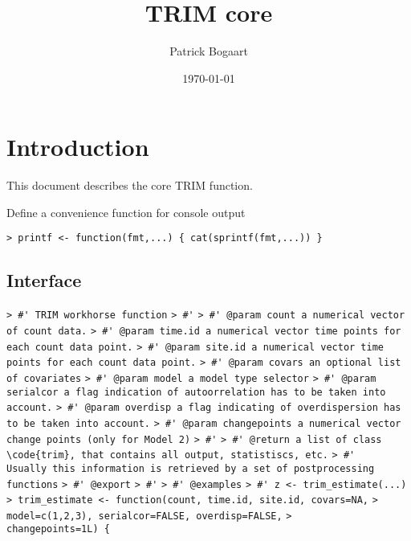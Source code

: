 \documentclass[a4paper]{article}
\begin{document}
\let\Sum=\sum
\newcommand{\diag}[1]{\operatorname{diag}(#1)}
\newcommand{\var}[1]{\operatorname{var}(#1)}
\newcommand{\cov}[1]{\operatorname{cov}(#1)}
\newcommand{\se}[1]{\operatorname{S.E.}(#1)}
\newcommand{\Mu}{{\mu_{+}}} 

\title{TRIM core}
\author{Patrick Bogaart}
\date{\today}
\section{Introduction}
This document describes the core TRIM function.\par

Define a convenience function for console output\par
\verb~> printf <- function(fmt,...) { cat(sprintf(fmt,...)) }~\par



\subsection{Interface}\par

\verb~> #' TRIM workhorse function~\newline
\verb~> #'~\newline
\verb~> #' @param count a numerical vector of count data.~\newline
\verb~> #' @param time.id a numerical vector time points for each count data point.~\newline
\verb~> #' @param site.id a numerical vector time points for each count data point.~\newline
\verb~> #' @param covars an optional list of covariates~\newline
\verb~> #' @param model a model type selector~\newline
\verb~> #' @param serialcor a flag indication of autoorrelation has to be taken into account.~\newline
\verb~> #' @param overdisp a flag indicating of overdispersion has to be taken into account.~\newline
\verb~> #' @param changepoints a numerical vector change points (only for Model 2)~\newline
\verb~> #'~\newline
\verb~> #' @return a list of class \code{trim}, that contains all output, statistiscs, etc.~\newline
\verb~> #'   Usually this information is retrieved by a set of postprocessing functions~\newline
\verb~> #' @export~\newline
\verb~> #'~\newline
\verb~> #' @examples~\newline
\verb~> #' z <- trim_estimate(...)~\newline
\verb~> trim_estimate <- function(count, time.id, site.id, covars=NA,~\newline
\verb~>                           model=c(1,2,3), serialcor=FALSE, overdisp=FALSE,~\newline
\verb~>                           changepoints=1L) {~\par
\end{document}
